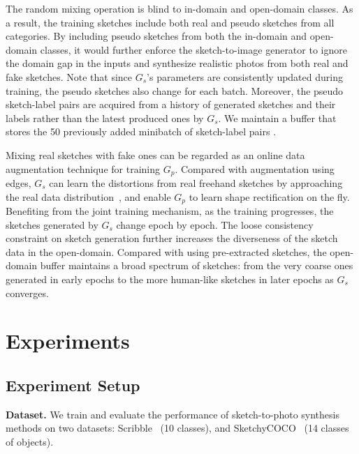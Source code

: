 \documentclass[10pt,twocolumn,letterpaper]{article}
\begin{document}
The random mixing operation is blind to in-domain and open-domain classes. As a result, the training sketches include both real and pseudo sketches from all categories. By including pseudo sketches from both the in-domain and open-domain classes, it would further enforce the sketch-to-image generator to ignore the domain gap in the inputs and synthesize realistic photos from both real and fake sketches. Note that since $ G_{s}$'s parameters are consistently updated during training, the pseudo sketches also change for each batch. Moreover, the pseudo sketch-label pairs are acquired from a history of generated sketches and their labels rather than the latest produced ones by $G_{s}$. We maintain a buffer that stores the 50 previously added minibatch of sketch-label pairs \cite{shrivastava2017learning,zhu2017unpaired}. 

Mixing real sketches with fake ones can be regarded as an online data augmentation technique for training $G_{p}$. Compared with augmentation using edges, $G_{s}$ can learn the distortions from real freehand sketches by approaching the real data distribution~\cite{goodfellow2014generative,ledig2017photo,zhou2019kernel}, and enable $G_{p}$ to learn shape rectification on the fly. Benefiting from the joint training mechanism, as the training progresses, the sketches generated by $G_{s}$ change epoch by epoch. The loose consistency constraint on sketch generation further increases the diverseness of the sketch data in the open-domain. Compared with using pre-extracted sketches, the open-domain buffer maintains a broad spectrum of sketches: from the very coarse ones generated in early epochs to the more human-like sketches in later epochs as $G_{s}$ converges. 







\section{Experiments}


\subsection{Experiment Setup}
\label{sec:exp_setup}
\noindent \textbf{Dataset.} We train and evaluate the performance of sketch-to-photo synthesis methods on two datasets: Scribble~\cite{ghosh2019interactive} (10 classes), and SketchyCOCO~\cite{gao2020sketchycoco} (14 classes of objects). 
\end{document}
